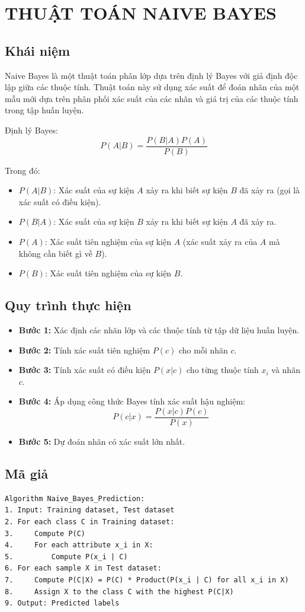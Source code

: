 \section{THUẬT TOÁN NAIVE BAYES}

\subsection{Khái niệm}
Naive Bayes là một thuật toán phân lớp dựa trên định lý Bayes với giả định độc lập giữa các thuộc tính. Thuật toán này sử dụng xác suất để đoán nhãn của một mẫu mới dựa trên phân phối xác suất của các nhãn và giá trị của các thuộc tính trong tập huấn luyện.

Định lý Bayes:
$$P(A\vert{}B) = \frac{P(B\vert{}A)P(A)}{P(B)}$$

Trong đó:
\begin{itemize}
    \item $P(A\vert{}B)$: Xác suất của sự kiện $A$ xảy ra khi biết sự kiện $B$ đã xảy ra (gọi là xác suất có điều kiện).
    \item $P(B\vert{}A)$: Xác suất của sự kiện $B$ xảy ra khi biết sự kiện $A$ đã xảy ra.
    \item $P(A)$: Xác suất tiên nghiệm của sự kiện $A$ (xác suất xảy ra của $A$ mà không cần biết gì về $B$).
    \item $P(B)$: Xác suất tiên nghiệm của sự kiện $B$.
\end{itemize}

\subsection{Quy trình thực hiện}
\begin{itemize}
    \item \textbf{Bước 1:} Xác định các nhãn lớp và các thuộc tính từ tập dữ liệu huấn luyện.
    \item \textbf{Bước 2:} Tính xác suất tiên nghiệm $P(c)$ cho mỗi nhãn $c$.
    \item \textbf{Bước 3:} Tính xác suất có điều kiện $P(x\vert{}c)$ cho từng thuộc tính $x_i$ và nhãn $c$.
    \item \textbf{Bước 4:} Áp dụng công thức Bayes tính xác suất hậu nghiệm:
    $$P(c\vert{}x) = \frac{P(x\vert{}c)P(c)}{P(x)}$$
    \item \textbf{Bước 5:} Dự đoán nhãn có xác suất lớn nhất.
\end{itemize}

\subsection{Mã giả}
\begin{lstlisting}[caption={Mã giả thuật toán Naïve Bayes}]
Algorithm Naive_Bayes_Prediction:
1. Input: Training dataset, Test dataset
2. For each class C in Training dataset:
3.     Compute P(C)
4.     For each attribute x_i in X:
5.         Compute P(x_i | C)
6. For each sample X in Test dataset:
7.     Compute P(C|X) = P(C) * Product(P(x_i | C) for all x_i in X)
8.     Assign X to the class C with the highest P(C|X)
9. Output: Predicted labels
\end{lstlisting}

